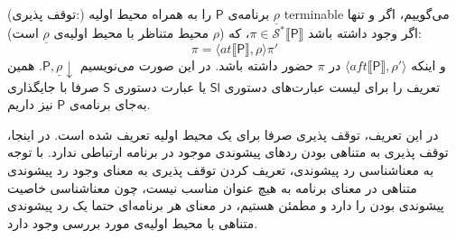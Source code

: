 \begin{defn}
(توقف پذیری:) برنامه‌ی $\mathsf{P}$ را به همراه محیط اولیه
 $\underline{\rho}$
  \gls{terminable}
  می‌گوییم، اگر و تنها اگر وجود داشته باشد 
	$\pi \in \mathcal{S}^* \llbracket \mathsf{P} \rrbracket$، 
	که ($\rho$ محیط متناظر با محیط اولیه‌ی $\underline{\rho}$ است):
	$$\pi = \langle at \llbracket \mathsf{P} \rrbracket , \rho \rangle \pi'$$
	و اینکه $\langle aft\llbracket \mathsf{P} \rrbracket , \rho' \rangle$ در $\pi$ حضور داشته باشد. در این صورت می‌نویسیم
	$\mathsf{P,\underline{\rho}\downarrow}$.
همین تعریف را برای لیست عبارت‌های دستوری $\mathsf{Sl}$ یا عبارت‌ دستوری $\mathsf{S}$ صرفا با جایگذاری به‌جای برنامه‌ی $\mathsf{P}$ نیز داریم.
\end{defn} 
در این تعریف، توقف پذیری صرفا برای یک محیط اولیه تعریف شده است.
در اینجا، توقف پذیری به متناهی بودن ردهای پیشوندی موجود در برنامه ارتباطی ندارد. با توجه به معناشناسی‌ رد پیشوندی، تعریف کردن توقف پذیری به معنای وجود رد پیشوندی متناهی در معنای برنامه به هیچ عنوان مناسب نیست، چون معناشناسی خاصیت پیشوندی بودن را دارد و مطمئن هستیم، در معنای هر برنامه‌ای حتما یک رد پیشوندی متناهی با محیط اولیه‌ی مورد بررسی وجود دارد.

